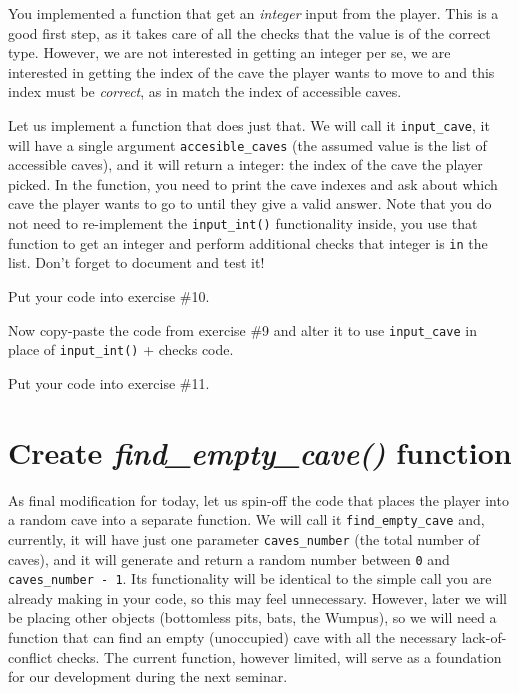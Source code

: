 \documentclass[
]{book}
\begin{document}
You implemented a function that get an \emph{integer} input from the player. This is a good first step, as it takes care of all the checks that the value is of the correct type. However, we are not interested in getting an integer per se, we are interested in getting the index of the cave the player wants to move to and this index must be \emph{correct}, as in match the index of accessible caves.

Let us implement a function that does just that. We will call it \texttt{input\_cave}, it will have a single argument \texttt{accesible\_caves} (the assumed value is the list of accessible caves), and it will return a integer: the index of the cave the player picked. In the function, you need to print the cave indexes and ask about which cave the player wants to go to until they give a valid answer. Note that you do not need to re-implement the \texttt{input\_int()} functionality inside, you use that function to get an integer and perform additional checks that integer is \texttt{in} the list. Don't forget to document and test it!

Put your code into exercise \#10.

Now copy-paste the code from exercise \#9 and alter it to use \texttt{input\_cave} in place of \texttt{input\_int()} + checks code.

Put your code into exercise \#11.

\hypertarget{create-find_empty_cave-function}{%
\section{\texorpdfstring{Create \emph{find\_empty\_cave()} function}{Create find\_empty\_cave() function}}\label{create-find_empty_cave-function}}

As final modification for today, let us spin-off the code that places the player into a random cave into a separate function. We will call it \texttt{find\_empty\_cave} and, currently, it will have just one parameter \texttt{caves\_number} (the total number of caves), and it will generate and return a random number between \texttt{0} and \texttt{caves\_number\ -\ 1}. Its functionality will be identical to the simple call you are already making in your code, so this may feel unnecessary. However, later we will be placing other objects (bottomless pits, bats, the Wumpus), so we will need a function that can find an empty (unoccupied) cave with all the necessary lack-of-conflict checks. The current function, however limited, will serve as a foundation for our development during the next seminar.
\end{document}
